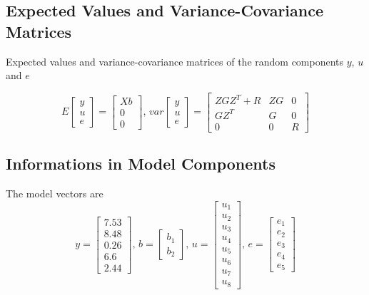 \documentclass[
]{article}
\begin{document}
\hypertarget{expected-values-and-variance-covariance-matrices}{%
\subsection{Expected Values and Variance-Covariance
Matrices}\label{expected-values-and-variance-covariance-matrices}}

Expected values and variance-covariance matrices of the random
components \(y\), \(u\) and \(e\)

\[
E \left[\begin{array}{c} y \\ u\\ e\end{array}\right]  = \left[\begin{array}{c} Xb \\ 0 \\ 0\end{array}\right] \text{, }
var \left[\begin{array}{c} y \\ u \\ e\end{array}\right]  =  \left[\begin{array}{ccc} ZGZ^T+R & ZG  &  0 \\ GZ^T & G & 0 \\ 0  &  0 & R \end{array}\right]
\]

\hypertarget{informations-in-model-components}{%
\subsection{Informations in Model
Components}\label{informations-in-model-components}}

The model vectors are \[
y = \begin{bmatrix} 7.53 \\8.48 \\0.26 \\6.6 \\2.44\end{bmatrix}\text{, }b = \begin{bmatrix} b_{1} \\b_{2}\end{bmatrix}\text{, }u = \begin{bmatrix} u_{1} \\u_{2} \\u_{3} \\u_{4} \\u_{5} \\u_{6} \\u_{7} \\u_{8}\end{bmatrix}\text{, }e = \begin{bmatrix} e_{1} \\e_{2} \\e_{3} \\e_{4} \\e_{5}\end{bmatrix} 
\]
\end{document}

